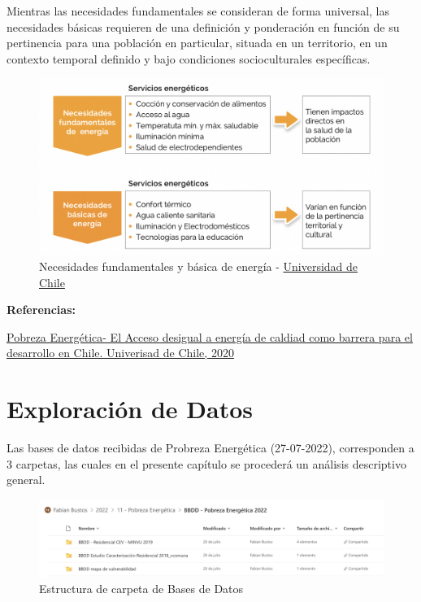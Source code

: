 \documentclass[
]{book}
\begin{document}
Mientras las necesidades fundamentales se consideran de forma universal, las necesidades básicas requieren de una definición y ponderación en función de su pertinencia para una población en particular, situada en un territorio, en un contexto temporal definido y bajo condiciones socioculturales específicas.

\begin{figure}
\centering
\includegraphics{images/necedidades_energia.png}
\caption{Necesidades fundamentales y básica de energía - \href{http://redesvid.uchile.cl/pobreza-energetica/wp-content/uploads/2020/09/Policy-Paper-Pobreza-Energe\%CC\%81tica.-El-acceso-desigual-a-energi\%CC\%81a-de-calidad-como-barrera-para-el-desarrollo-en-Chile.pdf}{Universidad de Chile}}
\end{figure}

\textbf{Referencias:}

\href{http://redesvid.uchile.cl/pobreza-energetica/wp-content/uploads/2020/09/Policy-Paper-Pobreza-Energe\%CC\%81tica.-El-acceso-desigual-a-energi\%CC\%81a-de-calidad-como-barrera-para-el-desarrollo-en-Chile.pdf}{Pobreza Energética- El Acceso desigual a energía de caldiad como barrera para el desarrollo en Chile. Univerisad de Chile, 2020}

\hypertarget{data_explorer}{%
\chapter{Exploración de Datos}\label{data_explorer}}

Las bases de datos recibidas de Probreza Energética (27-07-2022), corresponden a 3 carpetas, las cuales en el presente capítulo se procederá un análisis descriptivo general.

\begin{figure}
\centering
\includegraphics{images/bbdd_folders.png}
\caption{Estructura de carpeta de Bases de Datos}
\end{figure}
\end{document}
